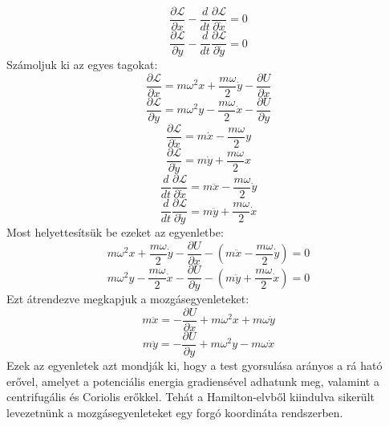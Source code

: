 \documentclass[a4paper,12pt]{article}
\begin{document}
\begin{equation}
    \frac{\partial \mathcal{L}}{\partial x} - \frac{d}{dt} \frac{\partial \mathcal{L}}{\partial \dot{x}} = 0
\end{equation}
\begin{equation}
    \frac{\partial \mathcal{L}}{\partial y} - \frac{d}{dt} \frac{\partial \mathcal{L}}{\partial \dot{y}} = 0
\end{equation}
Számoljuk ki az egyes tagokat:
\begin{equation}
    \frac{\partial \mathcal{L}}{\partial x} = m\omega^2 x + \frac{m\omega}{2} \dot{y} - \frac{\partial U}{\partial x}
\end{equation}
\begin{equation}
    \frac{\partial \mathcal{L}}{\partial y} = m\omega^2 y - \frac{m\omega}{2} \dot{x} - \frac{\partial U}{\partial y}
\end{equation}
\begin{equation}
    \frac{\partial \mathcal{L}}{\partial \dot{x}} = m \dot{x} - \frac{m\omega}{2} y
\end{equation}
\begin{equation}
    \frac{\partial \mathcal{L}}{\partial \dot{y}} = m \dot{y} + \frac{m\omega}{2} x
\end{equation}
\begin{equation}
    \frac{d}{dt} \frac{\partial \mathcal{L}}{\partial \dot{x}} = m \ddot{x} - \frac{m\omega}{2} \dot{y}
\end{equation}
\begin{equation}
    \frac{d}{dt} \frac{\partial \mathcal{L}}{\partial \dot{y}} = m \ddot{y} + \frac{m\omega}{2} \dot{x}
\end{equation}
Most helyettesítsük be ezeket az egyenletbe:
\begin{equation}
    m\omega^2 x + \frac{m\omega}{2} \dot{y} - \frac{\partial U}{\partial x} - (m \ddot{x} - \frac{m\omega}{2} \dot{y}) = 0
\end{equation}
\begin{equation}
    m\omega^2 y - \frac{m\omega}{2} \dot{x} - \frac{\partial U}{\partial y} - (m \ddot{y} + \frac{m\omega}{2} \dot{x}) = 0
\end{equation}
Ezt átrendezve megkapjuk a mozgásegyenleteket:
\begin{equation}
    m \ddot{x} = - \frac{\partial U}{\partial x} + m\omega^2 x + m\omega \dot{y}
\end{equation}
\begin{equation}
    m \ddot{y} = - \frac{\partial U}{\partial y} + m\omega^2 y - m\omega \dot{x}
\end{equation}
Ezek az egyenletek azt mondják ki, hogy a test gyorsulása arányos a rá ható erővel, amelyet a potenciális energia gradiensével adhatunk meg, valamint a centrifugális és Coriolis erőkkel.
Tehát a Hamilton-elvből kiindulva sikerült levezetnünk a mozgásegyenleteket egy forgó koordináta rendszerben.
\end{document}
